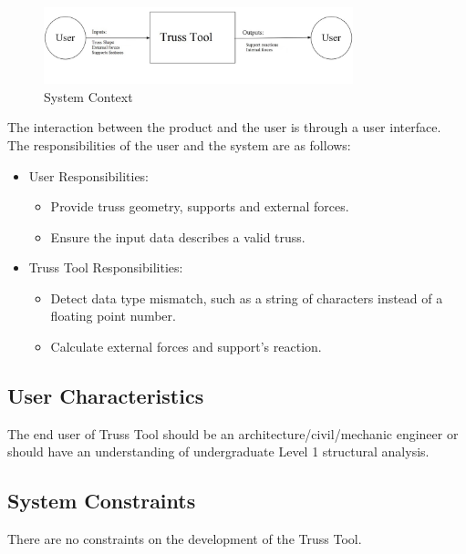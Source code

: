 \documentclass[12pt]{article}
\begin{document}
\begin{figure}[h!]
\begin{center}
 \includegraphics[width=0.8\textwidth]{systemcontext .jpg}
\caption{System Context}
\label{Fig_SystemContext} 
\end{center}
\end{figure}

The interaction between the product and the user is through a user interface. The responsibilities of the user and the system are as follows:
\begin{itemize}
\item User Responsibilities:
\begin{itemize}
\item Provide truss geometry, supports and external forces. 
\item Ensure the input data describes a valid truss.

\end{itemize}
\item Truss Tool Responsibilities:
\begin{itemize}
\item Detect data type mismatch, such as a string of characters instead of a  floating point number.
\item Calculate external forces and support's reaction.
\end{itemize}
\end{itemize}


\subsection{User Characteristics} \label{SecUserCharacteristics}

The end user of Truss Tool should be an architecture/civil/mechanic engineer or should have an understanding of undergraduate Level 1 structural analysis.

\subsection{System Constraints}

There are no constraints on the development of the Truss Tool.
\end{document}
